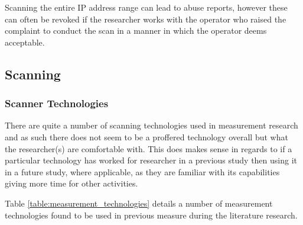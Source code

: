 \documentclass{mscreport}
\begin{document}
\vspace{0.3cm} \noindent
Scanning the entire IP address range can lead to abuse reports, however these can often be revoked if the researcher works with the operator who raised the complaint to conduct the scan in a manner in which the operator deems acceptable.

\subsection{Scanning}


\subsubsection{Scanner Technologies}

\noindent
There are quite a number of scanning technologies used in measurement research and as such there does not seem to be a proffered technology overall but what the researcher(s) are comfortable with. This does makes sense in regards to if a particular technology has worked for researcher in a previous study then using it in a future study, where applicable, as they are familiar with its capabilities giving more time for other activities.

\vspace{0.3cm} \noindent
Table \ref{table:measurement_technologies} details a number of measurement technologies found to be used in previous measure during the literature research.

\clearpage
\newpage
\end{document}
